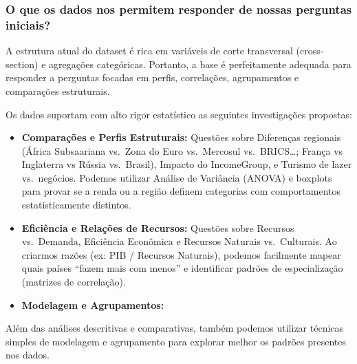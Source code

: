 \documentclass[
]{article}
\begin{document}
\subsubsection{O que os dados nos permitem responder de nossas perguntas
iniciais?}\label{o-que-os-dados-nos-permitem-responder-de-nossas-perguntas-iniciais}

A estrutura atual do dataset é rica em variáveis de corte transversal
(cross-section) e agregações categóricas. Portanto, a base é
perfeitamente adequada para responder a perguntas focadas em perfis,
correlações, agrupamentos e comparações estruturais.

Os dados suportam com alto rigor estatístico as seguintes investigações
propostas:

\begin{itemize}
\item
  \textbf{Comparações e Perfis Estruturais:} Questões sobre Diferenças
  regionais (África Subsaariana vs.~Zona do Euro vs.~Mercosul
  vs.~BRICS\ldots; França vs Inglaterra vs Rússia vs.~Brasil), Impacto
  do IncomeGroup, e Turismo de lazer vs.~negócios. Podemos utilizar
  Análise de Variância (ANOVA) e boxplots para provar se a renda ou a
  região definem categorias com comportamentos estatisticamente
  distintos.
\item
  \textbf{Eficiência e Relações de Recursos:} Questões sobre Recursos
  vs.~Demanda, Eficiência Econômica e Recursos Naturais vs.~Culturais.
  Ao criarmos razões (ex: PIB / Recursos Naturais), podemos facilmente
  mapear quais países ``fazem mais com menos'' e identificar padrões de
  especialização (matrizes de correlação).
\item
  \textbf{Modelagem e Agrupamentos:}
\end{itemize}

Além das análises descritivas e comparativas, também podemos utilizar
técnicas simples de modelagem e agrupamento para explorar melhor os
padrões presentes nos dados.
\end{document}
